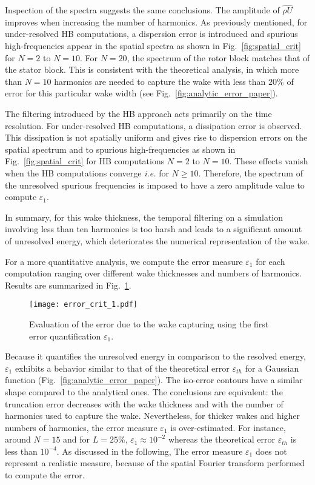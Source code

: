 Inspection of the spectra suggests the same conclusions.
The amplitude of $\widehat{\rho U}$ 
improves when increasing the number of harmonics.
As previously mentioned, for under-resolved HB computations,
a dispersion error is introduced and spurious high-frequencies appear 
in the spatial spectra as shown in Fig.~\ref{fig:spatial_crit}
for $N=2$ to $N=10$.
For $N=20$, the spectrum of the rotor 
block matches that of the stator block.
This is consistent with the theoretical analysis, in which more than 
$N=10$ harmonics are needed to capture the wake with less than $20\%$ 
of error for this particular
wake width (see Fig.~\ref{fig:analytic_error_paper}).

The filtering introduced by the HB approach 
acts primarily on the time resolution. 
For under-resolved HB computations, a dissipation error is observed.
This dissipation is not spatially uniform and gives rise to
dispersion errors on the spatial spectrum and to spurious
high-frequencies as shown in 
Fig.~\ref{fig:spatial_crit} for HB computations $N=2$ to $N=10$.
These effects vanish when the HB computations converge
\emph{i.e.} for $N \geq 10$.
Therefore, the spectrum of the unresolved spurious frequencies 
is imposed to have a zero amplitude value to compute
$\varepsilon_1$.

In summary, for this wake thickness, the temporal filtering 
on a simulation involving less than ten harmonics is too harsh and leads 
to a significant amount of unresolved energy, 
which deteriorates the numerical representation
of the wake.

For a more quantitative analysis, we compute the error measure
$\varepsilon_1$ for each computation ranging over different 
wake thicknesses and numbers of harmonics. 
Results are summarized in Fig.~\ref{fig:crit_1_3d}.
\begin{figure}[htp]
    \centering\texttt{[image: error\_crit\_1.pdf]}
  \caption{Evaluation of the error due to the wake 
  capturing using the first error quantification $\varepsilon_1$.}
  \label{fig:crit_1_3d}
\end{figure}
Because it quantifies the unresolved energy in 
comparison to the resolved energy, $\varepsilon_1$ 
exhibits a behavior similar to that of 
the theoretical error $\varepsilon_{th}$ for a Gaussian function 
(Fig.~\ref{fig:analytic_error_paper}).
The iso-error contours have a similar shape 
compared to the analytical ones. 
The conclusions are equivalent: the truncation error decreases with 
the wake thickness and with the number of harmonics used to capture the wake.
Nevertheless, for thicker wakes and higher numbers of harmonics, 
the error measure $\varepsilon_1$ is over-estimated. 
For instance, around $N=15$ and for $L=25\%$,
$\varepsilon_1 \approx 10^{-2}$ whereas the theoretical error $\varepsilon_{th}$
is less than $10^{-4}$. As discussed in the following, The error 
measure $\varepsilon_1$ does not represent a 
realistic measure, because of the spatial 
Fourier transform performed to compute 
the error.


